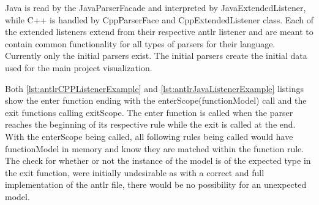 Java is read by the JavaParserFacade and interpreted by JavaExtendedListener, while C++ is handled by CppParserFace and CppExtendedListener class. Each of the extended listeners extend from their respective \gls{antlr} listener and are meant to contain common functionality for all types of parsers for their language. Currently only the initial parsers exist. The initial parsers create the initial data used for the main project visualization. 

Both \ref{lst:antlrCPPListenerExample} and \ref{lst:antlrJavaListenerExample} listings show the enter function ending with the enterScope(functionModel) call and the exit functions calling exitScope. The enter function is called when the parser reaches the beginning of its respective rule while the exit is called at the end. With the enterScope being called, all following rules being called would have functionModel in memory and know they are matched within the function rule. The check for whether or not the instance of the model is of the expected type in the exit function, were initially undesirable as with a correct and full implementation of the \gls{antlr} file, there would be no possibility for an unexpected model.
